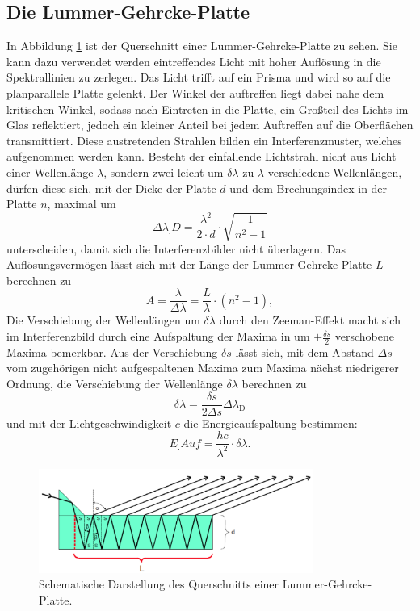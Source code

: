 \subsection{Die Lummer-Gehrcke-Platte}
In Abbildung \ref{fig:LGP} ist der Querschnitt einer Lummer-Gehrcke-Platte zu sehen.
Sie kann dazu verwendet werden eintreffendes Licht mit hoher Auflösung in die Spektrallinien zu zerlegen.
Das Licht trifft auf ein Prisma und wird so auf die planparallele Platte gelenkt. Der Winkel der auftreffen liegt dabei nahe dem kritischen Winkel, sodass nach Eintreten in die Platte, ein Großteil des Lichts im Glas reflektiert, jedoch ein kleiner Anteil bei jedem Auftreffen auf die Oberflächen transmittiert. Diese austretenden Strahlen bilden ein Interferenzmuster, welches aufgenommen werden kann.
Besteht der einfallende Lichtstrahl nicht aus Licht einer Wellenlänge $\lambda$, sondern zwei leicht um $\delta \lambda$ zu $\lambda$ verschiedene Wellenlängen, dürfen diese sich, mit der Dicke der Platte $d$ und dem Brechungsindex in der Platte $n$, maximal um
\begin{equation}
	\Delta\lambda_.{D} = \frac{\lambda^2}{2 \cdot d} \cdot \sqrt{\frac{1}{n^2-1}} \label{eq:disGebiet}
\end{equation}
unterscheiden, damit sich die Interferenzbilder nicht überlagern.
Das Auflösungsvermögen lässt sich mit der Länge der Lummer-Gehrcke-Platte $L$ berechnen zu
\begin{equation}
	A = \frac{\lambda}{\Delta\lambda} = \frac{L}{\lambda} \cdot \left(n^2-1\right), \label{eq:Aufloesung}
\end{equation}
Die Verschiebung der Wellenlängen um $\delta \lambda$ durch den Zeeman-Effekt macht sich im Interferenzbild durch eine Aufspaltung der Maxima in um $\pm\frac{\delta s}{2}$ verschobene Maxima bemerkbar. Aus der Verschiebung $\delta s$ lässt sich, mit dem Abstand $\Delta s$ vom zugehörigen nicht aufgespaltenen Maxima zum Maxima nächst niedrigerer Ordnung, die Verschiebung der Wellenlänge $\delta \lambda$ berechnen zu
\begin{equation}
\delta \lambda = \frac{\delta s}{2\Delta s} \Delta\lambda_\text{D} \label{eq:deltaLambda}
\end{equation}
und mit der Lichtgeschwindigkeit $c$ die Energieaufspaltung bestimmen:
\begin{equation}
E_.{Auf}=\frac{h c}{\lambda^2} \cdot \delta \lambda\text{.} \label{eq:EaufExp}
\end{equation}

\begin{figure}
\centering
\includegraphics[width=0.8\textwidth]{content/images/LGP.pdf}
\caption{Schematische Darstellung des Querschnitts einer Lummer-Gehrcke-Platte.\cite{V27}}
\label{fig:LGP}
\end{figure}
